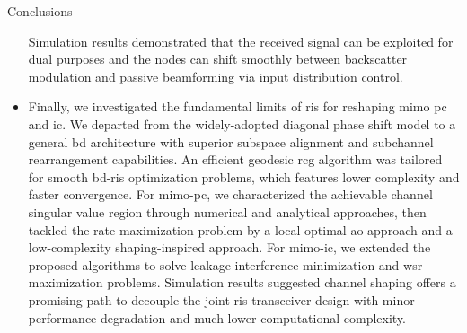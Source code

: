 \begin{section}{Conclusions}
\begin{itemize}
		Simulation results demonstrated that the received signal can be exploited for dual purposes and the nodes can shift smoothly between backscatter modulation and passive beamforming via input distribution control.
		\item Finally, we investigated the fundamental limits of \gls{ris} for reshaping \gls{mimo} \gls{pc} and \gls{ic}. We departed from the widely-adopted diagonal phase shift model to a general \gls{bd} architecture with superior subspace alignment and subchannel rearrangement capabilities.
		An efficient geodesic \gls{rcg} algorithm was tailored for smooth \gls{bd}-\gls{ris} optimization problems, which features lower complexity and faster convergence.
		For \gls{mimo}-\gls{pc}, we characterized the achievable channel singular value region through numerical and analytical approaches, then tackled the rate maximization problem by a local-optimal \gls{ao} approach and a low-complexity shaping-inspired approach.
		For \gls{mimo}-\gls{ic}, we extended the proposed algorithms to solve leakage interference minimization and \gls{wsr} maximization problems.
		Simulation results suggested channel shaping offers a promising path to decouple the joint \gls{ris}-transceiver design with minor performance degradation and much lower computational complexity.
	\end{itemize}
\end{section}

